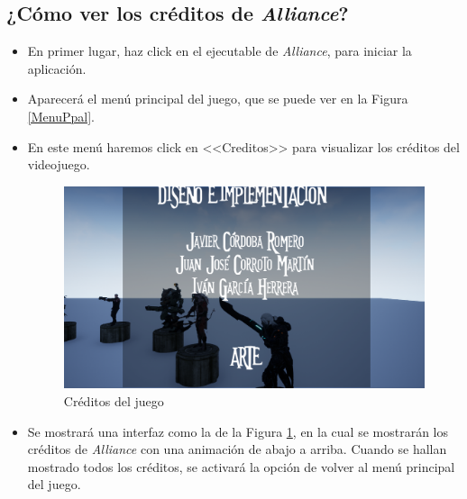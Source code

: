 \subsection{¿Cómo ver los créditos de \textit{Alliance}?}
\begin{itemize}
\item En primer lugar, haz click en el ejecutable de \textit{Alliance}, para iniciar la aplicación.
\item Aparecerá el menú principal del juego, que se puede ver en la Figura \ref{MenuPpal}.
\item En este menú haremos click en <<Creditos>> para visualizar los créditos del videojuego.

\begin{figure}[H]
  \centering
  \includegraphics[width=12cm]{./images/Creditos.png}
  \caption{Créditos del juego}
  \label{Creditos}
\end{figure}

\item Se mostrará una interfaz como la de la Figura \ref{Creditos}, en la cual se mostrarán los créditos de \textit{Alliance} con una animación de abajo a arriba. Cuando se hallan mostrado todos los créditos, se activará la opción de volver al menú principal del juego.
\end{itemize}
